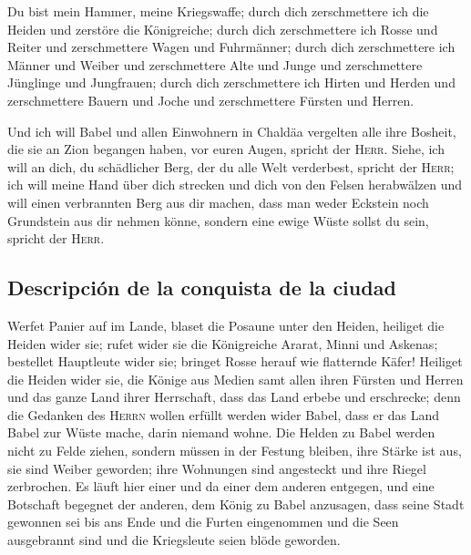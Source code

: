  Du bist mein Hammer, meine Kriegswaffe; durch dich
zerschmettere ich die Heiden und zerstöre die Königreiche;
 durch dich zerschmettere ich Rosse und Reiter und
zerschmettere Wagen und Fuhrmänner;  durch dich
zerschmettere ich Männer und Weiber und zerschmettere Alte und Junge und
zerschmettere Jünglinge und Jungfrauen;  durch dich
zerschmettere ich Hirten und Herden und zerschmettere Bauern und Joche
und zerschmettere Fürsten und Herren.

 Und ich will Babel und allen Einwohnern in Chaldäa
vergelten alle ihre Bosheit, die sie an Zion begangen haben, vor euren
Augen, spricht der \textsc{Herr}.  Siehe, ich will an
dich, du schädlicher Berg, der du alle Welt verderbest, spricht der
\textsc{Herr}; ich will meine Hand über dich strecken und dich von den
Felsen herabwälzen und will einen verbrannten Berg aus dir machen,
 dass man weder Eckstein noch Grundstein aus dir nehmen
könne, sondern eine ewige Wüste sollst du sein, spricht der
\textsc{Herr}.

\hypertarget{descripciuxf3n-de-la-conquista-de-la-ciudad}{%
\subsection{Descripción de la conquista de la
ciudad}\label{descripciuxf3n-de-la-conquista-de-la-ciudad}}

 Werfet Panier auf im Lande, blaset die Posaune unter den
Heiden, heiliget die Heiden wider sie; rufet wider sie die Königreiche
Ararat, Minni und Askenas; bestellet Hauptleute wider sie; bringet Rosse
herauf wie flatternde Käfer!  Heiliget die Heiden wider
sie, die Könige aus Medien samt allen ihren Fürsten und Herren und das
ganze Land ihrer Herrschaft,  dass das Land erbebe und
erschrecke; denn die Gedanken des \textsc{Herrn} wollen erfüllt werden
wider Babel, dass er das Land Babel zur Wüste mache, darin niemand
wohne.  Die Helden zu Babel werden nicht zu Felde ziehen,
sondern müssen in der Festung bleiben, ihre Stärke ist aus, sie sind
Weiber geworden; ihre Wohnungen sind angesteckt und ihre Riegel
zerbrochen.  Es läuft hier einer und da einer dem anderen
entgegen, und eine Botschaft begegnet der anderen, dem König zu Babel
anzusagen, dass seine Stadt gewonnen sei bis ans Ende 
und die Furten eingenommen und die Seen ausgebrannt sind und die
Kriegsleute seien blöde geworden.

